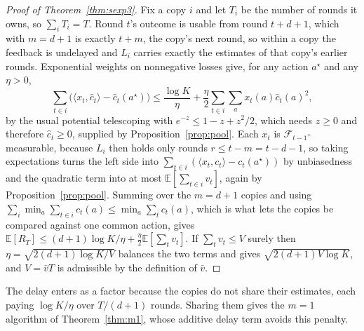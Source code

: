 \documentclass{article}
\theoremstyle{remark}
\newcommand{\Ex}{\mathbb{E}}
\begin{document}
\begin{proof}[Proof of Theorem~\ref{thm:sexp3}]
Fix a copy $i$ and let $T_i$ be the number of rounds it owns, so $\sum_iT_i=T$. Round $t$'s
outcome is usable from round $t+d+1$, which with $m=d+1$ is exactly $t+m$, the copy's next round,
so within a copy the feedback is undelayed and $L_i$ carries exactly the estimates of that copy's
earlier rounds. Exponential weights on nonnegative losses give, for any action $a^\star$ and any
$\eta>0$,
\[
\sum_{t\in i}\bigl(\langle x_t,\hat c_t\rangle-\hat c_t(a^\star)\bigr)
\le\frac{\log K}{\eta}+\frac{\eta}{2}\sum_{t\in i}\sum_ax_t(a)\hat c_t(a)^2 ,
\]
by the usual potential telescoping with $e^{-z}\le1-z+z^2/2$, which needs $z\ge0$ and therefore
$\hat c_t\ge0$, supplied by Proposition~\ref{prop:pool}. Each $x_t$ is
$\mathcal F_{t-1}$-measurable, because $L_i$ then holds only rounds $r\le t-m=t-d-1$, so taking
expectations turns the left side into $\sum_{t\in i}(\langle x_t,c_t\rangle-c_t(a^\star))$ by
unbiasedness and the quadratic term into at most $\Ex[\sum_{t\in i}v_t]$, again by
Proposition~\ref{prop:pool}. Summing over the $m=d+1$ copies and using
$\sum_i\min_a\sum_{t\in i}c_t(a)\le\min_a\sum_tc_t(a)$, which is what lets the copies be compared
against one common action, gives $\Ex[R_T]\le(d+1)\log K/\eta+\tfrac\eta2\Ex[\sum_tv_t]$. If
$\sum_tv_t\le V$ surely then $\eta=\sqrt{2(d+1)\log K/V}$ balances the two terms and gives
$\sqrt{2(d+1)V\log K}$, and $V=\bar vT$ is admissible by the definition of $\bar v$.
\end{proof}

The delay enters as a factor because the copies do not share their estimates, each paying
$\log K/\eta$ over $T/(d+1)$ rounds. Sharing them gives the $m=1$ algorithm of
Theorem~\ref{thm:m1}, whose additive delay term avoids this penalty.
\end{document}
